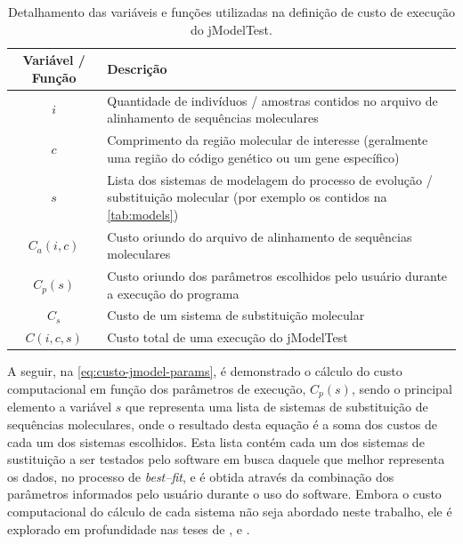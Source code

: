 \documentclass[english,brazilian]{UNISINOSmonografia} %
\newcommand\defaultFigureWidth{0.9}
\renewcommand{\arraystretch}{1.3}
\begin{document}
\begin{table}[tb]
	\centering%
	\begin{minipage}{\defaultFigureWidth\textwidth}
		\caption{Detalhamento das variáveis e funções utilizadas na definição de custo de execução do jModelTest.}
		\label{tab:custo-jmodel-elementos}
		\small
		\vspace{1ex}
		\renewcommand\arraystretch{1.4}
		\renewcommand {\tabularxcolumn}[1]{>{\arraybackslash}m{#1}}
		\begin{tabularx}{\textwidth}{cX@{}}
			\toprule
			Variável / Função & Descrição \\ 
			\midrule
			$ i $ & Quantidade de indivíduos / amostras contidos no arquivo de alinhamento de sequências moleculares \\
			$ c $ & Comprimento da região molecular de interesse (geralmente uma região do código genético ou um gene específico) \\
			$ s $ & Lista dos sistemas de modelagem do processo de evolução / substituição molecular (por exemplo os contidos na \autoref{tab:models}) \\
			$ C_a(i,c) $ & Custo oriundo do arquivo de alinhamento de sequências moleculares \\
			$ C_p(s) $ & Custo oriundo dos parâmetros escolhidos pelo usuário durante a execução do programa \\
			$ C_s $ & Custo de um sistema de substituição molecular \\
			$ C(i,c,s) $ & Custo total de uma execução do jModelTest \\
			\bottomrule	
		\end{tabularx}
	\end{minipage}
\end{table}


A seguir, na \autoref{eq:custo-jmodel-params}, é demonstrado o cálculo do custo computacional em função dos parâmetros de execução, $ C_p(s) $, sendo o principal elemento a variável $ s $ que representa uma lista de sistemas de substituição de sequências moleculares, onde o resultado desta equação é a soma dos custos de cada um dos sistemas escolhidos. 
Esta lista contém cada um dos sistemas de sustituição a ser testados pelo software em busca daquele que melhor representa os dados, no processo de \textit{best--fit}, e é obtida através da combinação dos parâmetros informados pelo usuário durante o uso do software.
Embora o custo computacional do cálculo de cada sistema não seja abordado neste trabalho, ele é explorado em profundidade nas teses de ,  e .
\end{document}
